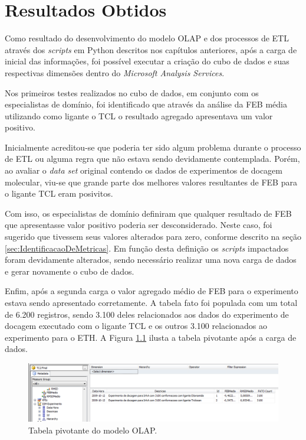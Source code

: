\chapter{Resultados Obtidos}
\label{cap:ResultadosObtidos}

Como resultado do desenvolvimento do modelo OLAP e dos processos de ETL através dos \emph{scripts} em Python descritos nos capítulos anteriores, após a carga de inicial das informações, foi possível executar a criação do cubo de dados e suas respectivas dimensões dentro do \emph{Microsoft Analysis Services}. 

Nos primeiros testes realizados no cubo de dados, em conjunto com os especialistas de domínio, foi identificado que através da análise da FEB média utilizando como ligante o TCL o resultado agregado apresentava um valor positivo. 

Inicialmente acreditou-se que poderia ter sido algum problema durante o processo de ETL ou alguma regra que não estava sendo devidamente contemplada. Porém, ao avaliar o \emph{data set} original contendo os dados de experimentos de docagem molecular, viu-se que grande parte dos melhores valores resultantes de FEB para o ligante TCL eram posivitos.

Com isso, os especialistas de domínio definiram que qualquer resultado de FEB que apresentasse valor positivo poderia ser desconsiderado. Neste caso, foi sugerido que tivessem seus valores alterados para zero, conforme descrito na seção \ref{sec:IdentificacaoDeMetricas}. Em função desta definição os \emph{scripts} impactados foram devidamente alterados, sendo necessário realizar uma nova carga de dados e gerar novamente o cubo de dados. 

Enfim, após a segunda carga o valor agregado médio de FEB para o experimento estava sendo apresentado corretamente. A tabela fato foi populada com um total de 6.200 registros, sendo 3.100 deles relacionados aos dados do experimento de docagem executado com o ligante TCL e os outros 3.100 relacionados ao experimento para o ETH. A Figura \ref{fig:TabPivotante} ilusta a tabela pivotante após a carga de dados.

\begin{figure}[h]
        \center
        \includegraphics[scale=0.45]{images/TabelaPivotante.PNG}
        \caption{Tabela pivotante do modelo OLAP.}
        \label{fig:TabPivotante}
\end{figure}

